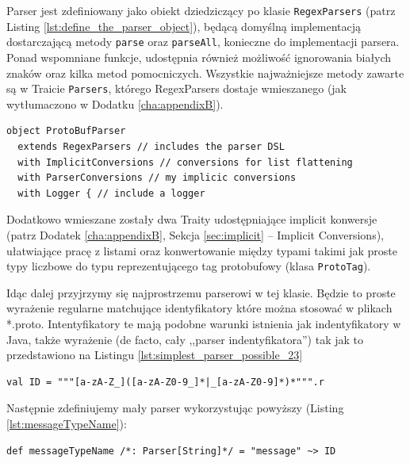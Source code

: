 \documentclass[pdflatex,11pt]{aghdpl}
\begin{document}
Parser jest zdefiniowany jako obiekt dziedziczący po klasie \verb|RegexParsers| (patrz Listing \ref{lst:define_the_parser_object}), będącą domyślną implementacją
dostarczającą metody \verb|parse| oraz \verb|parseAll|, konieczne do implementacji parsera. Ponad wspomniane funkcje,
udostępnia również możliwość ignorowania białych znaków oraz kilka metod pomocniczych. Wszystkie najważniejsze metody 
zawarte są w Traicie \verb|Parsers|, którego RegexParsers dostaje wmieszanego (jak wytłumaczono w Dodatku \ref{cha:appendixB}).

\begin{lstlisting}[caption={Definicja obiektu parsera}, label={lst:define_the_parser_object}]
object ProtoBufParser
  extends RegexParsers // includes the parser DSL
  with ImplicitConversions // conversions for list flattening
  with ParserConversions // my implicic conversions
  with Logger { // include a logger
\end{lstlisting}

Dodatkowo wmieszane zostały dwa Traity udostępniające implicit konwersje (patrz Dodatek \ref{cha:appendixB}, Sekcja \ref{sec:implicit} -- Implicit Conversions),
ułatwiające pracę z listami oraz konwertowanie między typami takimi jak proste typy liczbowe do typu reprezentującego tag protobufowy (klasa \verb|ProtoTag|).

Idąc dalej przyjrzymy się najprostrzemu parserowi w tej klasie. Będzie to proste wyrażenie regularne matchujące identyfikatory które można stosować w 
plikach *.proto. Intentyfikatory te mają podobne warunki istnienia jak indentyfikatory w Java, także wyrażenie (de facto, cały ,,parser indentyfikatora'') 
tak jak to przedstawiono na Listingu \ref{lst:simplest_parser_possible_23}

\begin{lstlisting}[caption={Bardzo prosty parser, zdefiniowany za pomocą implicita, który rozszerza API klasy String o metodę \textit{r} tworzącą wyrażenie regularne (instancję klasy \textit{scala.util.matching.Regex})},label={lst:simplest_parser_possible_23}]
val ID = """[a-zA-Z_]([a-zA-Z0-9_]*|_[a-zA-Z0-9]*)*""".r
\end{lstlisting}

Następnie zdefiniujemy mały parser wykorzystując powyższy (Listing \ref{lst:messageTypeName}):

\begin{lstlisting}[caption={Definicja parsera identyfikatora wiadomości}, label={lst:messageTypeName}]
def messageTypeName /*: Parser[String]*/ = "message" ~> ID
\end{lstlisting}
\end{document}
